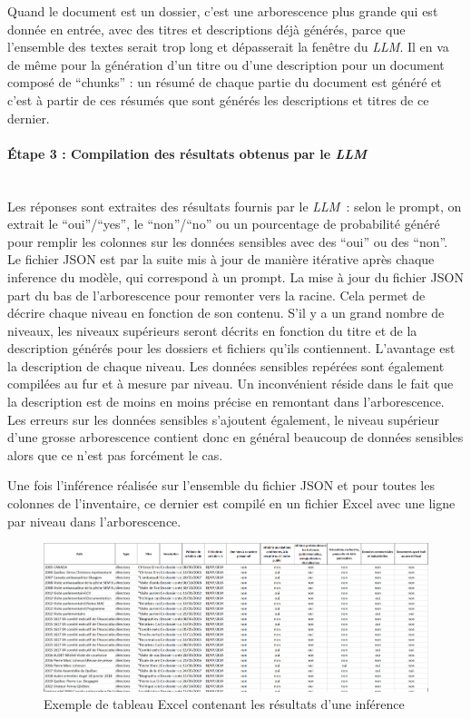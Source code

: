Quand le document est un dossier, c'est une arborescence plus grande qui est donnée en entrée, avec des titres et descriptions déjà générés, parce que l'ensemble des textes serait trop long et dépasserait la fenêtre du \emph{LLM}. Il en va de même pour la génération d'un titre ou d'une description pour un document composé de \enquote{chunks} : un résumé de chaque partie du document est généré
et c'est à partir de ces résumés que sont générés les descriptions et titres de ce dernier.

\paragraph*{Étape 3 : Compilation des résultats obtenus par le \emph{LLM}}\mbox{}\\

Les réponses sont extraites des résultats fournis par le \emph{LLM}~: selon le prompt, on extrait le \enquote{oui}/\enquote{yes}, le \enquote{non}/\enquote{no} ou un pourcentage de probabilité généré
 pour remplir les colonnes sur les données sensibles avec des \enquote{oui} ou des \enquote{non}.
Le fichier JSON est par la suite mis à jour de manière itérative après chaque \gls{inference} du modèle, qui correspond à un prompt.
La mise à jour du fichier JSON part du bas de l'arborescence pour remonter vers la racine. Cela permet de décrire chaque niveau en fonction de son contenu. S'il y a un grand nombre de niveaux,
 les niveaux supérieurs seront décrits en fonction du titre et de la description générés pour les dossiers et fichiers qu'ils contiennent.
 L'avantage est la description de chaque niveau. Les données sensibles repérées sont également compilées au fur et à mesure par niveau.
 Un inconvénient réside dans le fait que la description est de moins en moins précise en remontant dans l'arborescence. Les erreurs sur les données sensibles s'ajoutent également, 
 le niveau supérieur d'une grosse arborescence contient donc en général beaucoup de données sensibles alors que ce n'est pas forcément le cas.
 
 Une fois l'inférence réalisée sur l'ensemble du fichier JSON et pour toutes les colonnes de l'inventaire,
 ce dernier est compilé en un fichier Excel avec une ligne par niveau dans l'arborescence.\newline
 
 
 \begin{figure}[h!]
 	\centerline{\includegraphics[width=12cm]{./media/results.png}}
 	\caption{Exemple de tableau Excel contenant les résultats d'une inférence}
 \end{figure}
 
